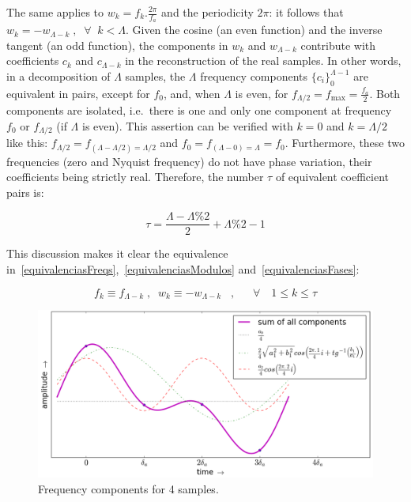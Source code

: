 The same applies to $w_k=f_k.\frac{2\pi}{f_a}$ and the periodicity $2\pi$: it follows that $w_k=-w_{\Lambda-k} \; ,\;\; \forall \;\; k<\Lambda$. Given the cosine (an even function) and the inverse tangent (an odd function), the components in $w_k$ and $w_{\Lambda-k}$ contribute with coefficients $c_k$ and $c_{\Lambda-k}$ in the reconstruction of the real samples. In other words, in a decomposition of $\Lambda$ samples, the $\Lambda$ frequency components $\{c_i\}_0^{\Lambda-1}$ are equivalent in pairs,
except for $f_0$, and, when $\Lambda$ is even, for $f_{\Lambda/2}=f_{\text{max}}=\frac{f_a}{2}$. Both components are isolated, i.e.\ there is one and only one component at frequency $f_0$ or $f_{\Lambda/2}$ (if $\Lambda$ is even). This assertion can be verified with $k=0$ and $k=\Lambda/2$ like this: $f_{\Lambda/2}=f_{(\Lambda-\Lambda/2) = \Lambda/2}$ and $f_0=f_{(\Lambda-0)=\Lambda}=f_0$.
Furthermore, these two frequencies (zero and Nyquist frequency) do not have phase variation, their coefficients being strictly real. Therefore, the number $\tau$ of equivalent coefficient pairs is:

\begin{equation}\label{coefsPareados}
\tau = \frac{\Lambda - \Lambda \% 2}{2} +\Lambda \% 2 -1
\end{equation}

This discussion makes it clear the equivalence in~\ref{equivalenciasFreqs},~\ref{equivalenciasModulos} and~\ref{equivalenciasFases}:

\begin{equation}\label{equivalenciasFreqs}
f_{k}\equiv f_{\Lambda-k}\;, \;\; w_{k}\equiv-w_{\Lambda-k}\;\;\;, \quad \;\; \forall \quad 1 \leq k \leq \tau  
\end{equation}

\begin{figure}
    \centering
        \includegraphics[width=.7\textwidth]{figures/amostras4____}
    \caption{Frequency components for 4 samples.}
        \label{fig:amostras4}
\end{figure}

